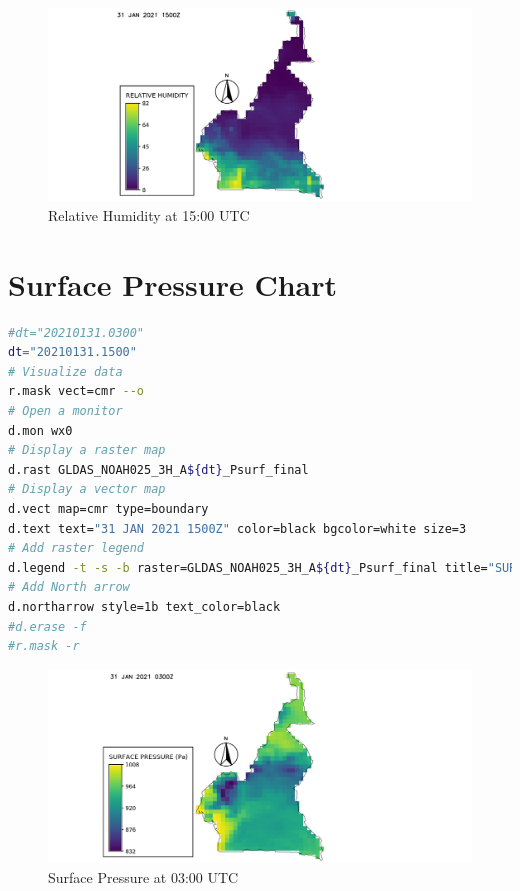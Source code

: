 \begin{figure}[H]
\begin{center}
\includegraphics[scale=0.6]{rh15.png} %
\end{center}
\caption{Relative Humidity at 15:00 UTC}
\label{Relative Humidity at 15:00 UTC}%
\end{figure}

\section{Surface Pressure Chart}
\begin{lstlisting}[language=Bash]
#dt="20210131.0300"
dt="20210131.1500"
# Visualize data
r.mask vect=cmr --o
# Open a monitor
d.mon wx0
# Display a raster map
d.rast GLDAS_NOAH025_3H_A${dt}_Psurf_final 
# Display a vector map
d.vect map=cmr type=boundary
d.text text="31 JAN 2021 1500Z" color=black bgcolor=white size=3
# Add raster legend
d.legend -t -s -b raster=GLDAS_NOAH025_3H_A${dt}_Psurf_final title="SURFACE PRESSURE (Pa)" title_fontsize=20 font=sans fontsize=18
# Add North arrow
d.northarrow style=1b text_color=black
#d.erase -f
#r.mask -r
\end{lstlisting}

\begin{figure}[H]
\begin{center}
\includegraphics[scale=0.6]{sp03.png} %
\end{center}
\caption{Surface Pressure at 03:00 UTC}
\label{Surface Pressure  at 03:00 UTC}%
\end{figure}

